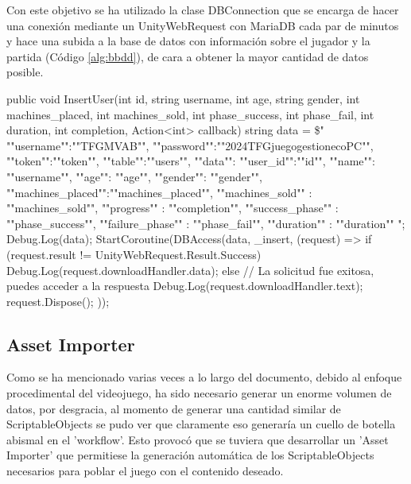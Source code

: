 Con este objetivo se ha utilizado la clase DBConnection que se encarga de hacer una conexión mediante un UnityWebRequest con MariaDB cada par de minutos y hace una subida a la base de datos con información sobre el jugador y la partida (Código \ref{alg:bbdd}), de cara a obtener la mayor cantidad de datos posible.
\begin{mypython}[caption={Código para hacer inserciones en la BBDD.},label={alg:bbdd}]
public void InsertUser(int id, string username, int age, 
    string gender, int machines_placed, int machines_sold, 
    int phase_success, int phase_fail, int duration, 
    int completion, Action<int> callback)
{
    string data = \$\@"{{
                    ""username"":""TFGMVAB"", 
                    ""password"":""2024TFGjuegogestionecoPC"", 
                    ""token"":""{token}"",
                    ""table"":""users"",
                    ""data"": {
                     {""user_id"":""{id}"",
                     ""name"": ""{username}"",
                     ""age"": ""{age}"",
                     ""gender"": ""{gender}"",
                     ""machines_placed"":""{machines_placed}"",
                     ""machines_sold"" : ""{machines_sold}"",
                     ""progress"" : ""{completion}"",
                     ""success_phase"" : ""{phase_success}"",
                     ""failure_phase"" : ""{phase_fail}"",
                     ""duration"" : ""{duration}""}}
    }}";
    Debug.Log(data);
    StartCoroutine(DBAccess(data, _insert, (request) =>
    {
        if (request.result != UnityWebRequest.Result.Success)
        {
            Debug.Log(request.downloadHandler.data);
        }
        else
        {
            // La solicitud fue exitosa, puedes acceder a la respuesta
            Debug.Log(request.downloadHandler.text);
        }
        request.Dispose();
    }));
}
\end{mypython}

\subsection{Asset Importer}

Como se ha mencionado varias veces a lo largo del documento, debido al enfoque procedimental del videojuego, ha sido necesario generar un enorme volumen de datos, por desgracia, al momento de generar una cantidad similar de ScriptableObjects se pudo ver que claramente eso generaría un cuello de botella abismal en el 'workflow'. Esto provocó que se tuviera que desarrollar un 'Asset Importer' que permitiese la generación automática de los ScriptableObjects necesarios para poblar el juego con el contenido deseado.

